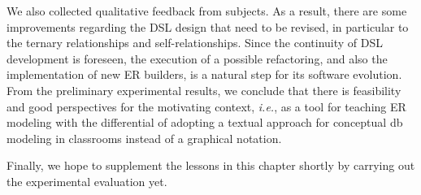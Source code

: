 We also collected qualitative feedback from subjects. 
As a result, there are some improvements regarding the DSL design that need to be revised, in particular to the ternary relationships and self-relationships.
Since the continuity of DSL development is foreseen, the execution of a possible refactoring, and also the implementation of new ER builders, is a natural step for its software evolution.
From the preliminary experimental results, we conclude that there is feasibility and good perspectives for the motivating context, \textit{i.e.}, as a tool for teaching ER modeling with the differential of adopting a textual approach for conceptual \ac{db} modeling in classrooms instead of a graphical notation.

Finally, we hope to supplement the lessons in this chapter shortly by carrying out the experimental evaluation yet.







